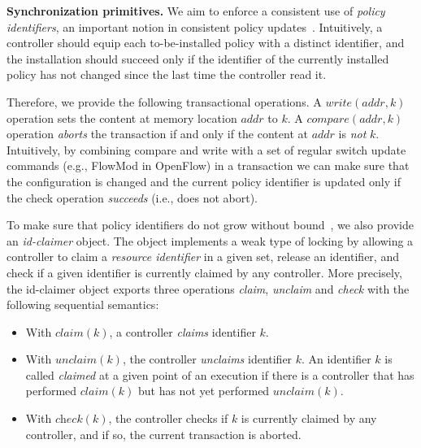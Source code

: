 \documentclass{sig-alternate-2006}
\newcommand{\Nat}{\mathbb{N}}
\newcommand{\claimcheck}{check\xspace}
\newcommand{\compare}{compare\xspace}
\newcommand{\addr}{\textit{addr}\xspace}
\begin{document}
\vspace{1mm}
\noindent\textbf{Synchronization primitives.}
%
We aim to enforce a consistent use of  \emph{policy identifiers},
an important notion in consistent policy updates~\cite{network-update,infocom15}.
Intuitively, a controller should
equip each to-be-installed policy with a distinct
identifier,
and the installation should succeed only if the identifier of the
currently installed policy has not changed since the last time the
controller read it.

Therefore, we provide the following transactional operations.
A $\textit{write}(\addr,k)$ operation sets the content at memory location
$\addr$ to $k$.
A $\textit{\compare}(\addr,k)$ operation \emph{aborts} the transaction
if and only if the content at
$\addr$ is \emph{not} $k$.
Intuitively, by combining compare and write with a set of regular
switch update commands (e.g., FlowMod in OpenFlow) 
in a transaction  we can make sure that the
configuration is changed and the current policy identifier is updated
only if the check operation \emph{succeeds} (i.e., does not abort).

To make sure that policy identifiers do not grow without bound~\cite{infocom15}, we
also provide an \emph{id-claimer} object.
The object implements a weak type
of locking by allowing a controller to claim a \emph{resource identifier} in a
given set, release an identifier,  and check if a given identifier
is currently claimed by any controller.
More precisely, the id-claimer object exports three operations \emph{claim},
\emph{unclaim} and \emph{\claimcheck} with the following sequential
semantics:

\begin{itemize}
\item With $\textit{claim}(k)$,
a controller %
\emph{claims}  identifier $k$.

\item With $\textit{unclaim}(k)$, %
the controller %
  \emph{unclaims} identifier $k$.
An identifier $k$ is called \emph{claimed} at a given point of an
execution if there is a controller that has performed $\textit{claim}(k)$
but has not yet performed  $\textit{unclaim}(k)$.

\item With $\textit{\claimcheck}(k)$, the controller checks if $k$ is
  currently claimed by any controller, and if so, the current transaction is
  aborted.

\end{itemize}
\end{document}
